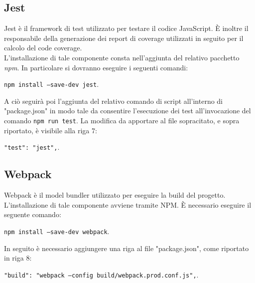 \subsection{Jest}\label{jest}
Jest è il framework di test utilizzato per testare il codice JavaScript. È inoltre il responsabile della generazione dei report di coverage utilizzati in seguito per il calcolo del code coverage.\\
L'installazione di tale componente consta nell'aggiunta del relativo pacchetto \textit{npm}. In particolare si dovranno eseguire i seguenti comandi:
\begin{center}
\texttt{npm install --save-dev jest}.
\end{center}
A ciò seguirà poi l'aggiunta del relativo comando di script all'interno di "package.json" in modo tale da consentire l'esecuzione dei test all'invocazione del comando \texttt{npm run test}. La modifica da apportare al file sopracitato, e sopra riportato, è visibile alla riga 7:
\begin{center}
	\texttt{"test": "jest",}.
\end{center}

\subsection{Webpack}\label{webpack}
Webpack è il model bundler utilizzato per eseguire la build del progetto.\\
L'installazione di tale componente avviene tramite NPM. È necessario eseguire il seguente comando:
\begin{center}
	\texttt{npm install --save-dev webpack}.
\end{center}
In seguito è necessario aggiungere una riga al file "package.json", come riportato in riga 8:
\begin{center}
	\texttt{"build": "webpack --config build/webpack.prod.conf.js",}.
\end{center}


